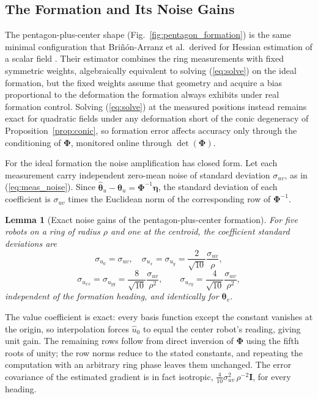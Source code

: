 \documentclass[lettersize,journal]{IEEEtran}
\newtheorem{lemma}{Lemma}
\begin{document}
\subsection{The Formation and Its Noise Gains}
\label{sec:formation}

The pentagon-plus-center shape (Fig.~\ref{fig:pentagon_formation}) is
the same minimal configuration that Bri\~{n}\'{o}n-Arranz et al.\
derived for Hessian estimation of a scalar field \cite{15}. Their
estimator combines the ring measurements with fixed symmetric weights,
algebraically equivalent to solving (\ref{eq:solve}) on the ideal
formation, but the fixed weights assume that geometry and acquire a
bias proportional to the deformation the formation always exhibits
under real formation control. Solving (\ref{eq:solve}) at the measured
positions instead remains exact for quadratic fields under any
deformation short of the conic degeneracy of
Proposition~\ref{prop:conic}, so formation error affects accuracy only
through the conditioning of $\boldsymbol{\Phi}$, monitored online
through $\det(\boldsymbol{\Phi})$.

For the ideal formation the noise amplification has closed form. Let each
measurement carry independent zero-mean noise of standard deviation
$\sigma_{uv}$, as in (\ref{eq:meas_noise}). Since
$\hat{\boldsymbol{\theta}}_u - \boldsymbol{\theta}_u =
\boldsymbol{\Phi}^{-1}\boldsymbol{\eta}$, the standard deviation of each
coefficient is $\sigma_{uv}$ times the Euclidean norm of the
corresponding row of $\boldsymbol{\Phi}^{-1}$.

\begin{lemma}[Exact noise gains of the pentagon-plus-center formation]
\label{lem:gains}
For five robots on a ring of radius $\rho$ and one at the centroid, the
coefficient standard deviations are
\begin{equation}
    \sigma_{u_0} = \sigma_{uv}, \quad
    \sigma_{u_x} = \sigma_{u_y} = \frac{2}{\sqrt{10}}\frac{\sigma_{uv}}{\rho},
    \label{eq:gain_grad}
\end{equation}
\begin{equation}
    \sigma_{u_{xx}} = \sigma_{u_{yy}} = \frac{8}{\sqrt{10}}
    \frac{\sigma_{uv}}{\rho^2},
    \qquad
    \sigma_{u_{xy}} = \frac{4}{\sqrt{10}}\frac{\sigma_{uv}}{\rho^2},
    \label{eq:gain_hess}
\end{equation}
independent of the formation heading, and identically for
$\boldsymbol{\theta}_v$.
\end{lemma}

\begin{IEEEproof}
The value coefficient is exact: every basis function except the constant
vanishes at the origin, so interpolation forces $\hat{u}_0$ to equal the
center robot's reading, giving unit gain. The remaining rows follow from
direct inversion of $\boldsymbol{\Phi}$ using the fifth roots of unity;
the row norms reduce to the stated constants, and repeating the
computation with an arbitrary ring phase leaves them unchanged. The
error covariance of the estimated gradient is in fact isotropic,
$\tfrac{4}{10}\sigma_{uv}^2\,\rho^{-2}\mathbf{I}$, for every heading.
\end{IEEEproof}
\end{document}
